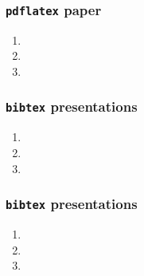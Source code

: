 \begin{frame}
\frametitle{\texttt{pdflatex} paper }
\begin{enumerate}
\item 
\item 
\item 
\end{enumerate}
\end{frame}


\begin{frame}
\frametitle{\texttt{bibtex} presentations }
\begin{enumerate}
\item 
\item 
\item 
\end{enumerate}
\end{frame} 

\begin{frame}
\frametitle{\texttt{bibtex} presentations }
\begin{enumerate}
\item 
\item 
\item 
\end{enumerate}
\end{frame}


